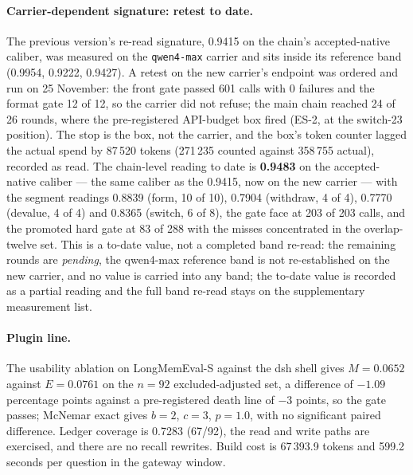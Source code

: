 \documentclass[11pt,a4paper]{article}
\begin{document}
\paragraph{Carrier-dependent signature: retest to date.}
The previous version's re-read signature, 0.9415 on the chain's accepted-native caliber, was measured on the \texttt{qwen4-max} carrier and sits inside its reference band (0.9954, 0.9222, 0.9427). A retest on the new carrier's endpoint was ordered and run on 25 November: the front gate passed 601 calls with 0 failures and the format gate 12 of 12, so the carrier did not refuse; the main chain reached 24 of 26 rounds, where the pre-registered API-budget box fired (ES-2, at the switch-23 position). The stop is the box, not the carrier, and the box's token counter lagged the actual spend by 87\,520 tokens (271\,235 counted against 358\,755 actual), recorded as read. The chain-level reading to date is \textbf{0.9483} on the accepted-native caliber --- the same caliber as the 0.9415, now on the new carrier --- with the segment readings 0.8839 (form, 10 of 10), 0.7904 (withdraw, 4 of 4), 0.7770 (devalue, 4 of 4) and 0.8365 (switch, 6 of 8), the gate face at 203 of 203 calls, and the promoted hard gate at 83 of 288 with the misses concentrated in the overlap-twelve set. This is a to-date value, not a completed band re-read: the remaining rounds are \emph{pending}, the qwen4-max reference band is not re-established on the new carrier, and no value is carried into any band; the to-date value is recorded as a partial reading and the full band re-read stays on the supplementary measurement list.

\paragraph{Plugin line.}
The usability ablation on LongMemEval-S against the dsh shell gives $M = 0.0652$ against $E = 0.0761$ on the $n = 92$ excluded-adjusted set, a difference of $-1.09$ percentage points against a pre-registered death line of $-3$ points, so the gate passes; McNemar exact gives $b = 2$, $c = 3$, $p = 1.0$, with no significant paired difference. Ledger coverage is 0.7283 (67/92), the read and write paths are exercised, and there are no recall rewrites. Build cost is 67\,393.9 tokens and 599.2 seconds per question in the gateway window.
\end{document}
